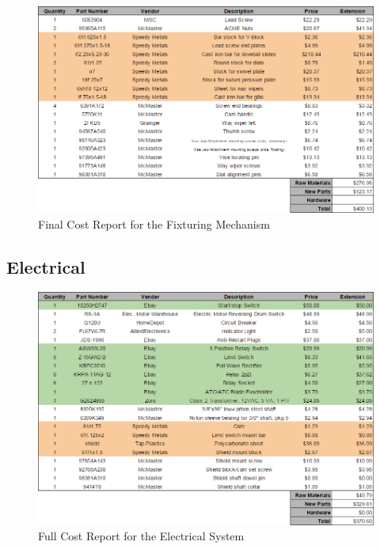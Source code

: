 \begin{figure}[htp]
    \centering
    \includegraphics[width=1.0\textwidth]{./images/Chapter4-BillofMaterials/FCRF}
    \caption{Final Cost Report for the Fixturing Mechanism}
    \label{fig:FCRF}
\end{figure}


\newpage

\subsection{Electrical}

\begin{figure}[H]
    \centering
    \includegraphics[width=1.0\textwidth]{./images/Chapter4-BillofMaterials/CRE}
    \caption{Full Cost Report for the Electrical System}
    \label{fig:CRE}
\end{figure}


